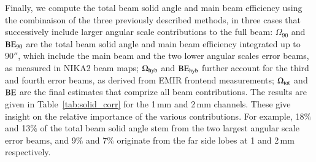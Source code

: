 {\rev Finally, we compute the total beam solid angle and main beam
efficiency using the combinaison of the three previously described
methods, in three cases that successively include larger angular scale
contributions to the full beam: $\Omega_{90}$ and $\rm{BE}_{90}$ are
the total beam solid angle and main beam efficiency integrated up to
$90''$, which include the main beam and the two lower angular scales
error beams, as measured in NIKA2 beam maps; $\Omega_{\rm{hyb}}$ and
$\rm{BE}_{\rm{hyb}}$ further account for the third and fourth error
beams, as derived from EMIR frontend measurements; $\Omega_{\rm{tot}}$
and $\rm{BE}$ are the final estimates that comprize all beam
contributions. The results are given in Table~\ref{tab:solid_corr} for
the 1\,mm and 2\,mm channels. These give insight on the relative
importance of the various contributions. For example, 18$\%$ and
13$\%$ of the total beam solid angle stem from the two largest angular
scale error beams, and 9$\%$ and 7$\%$ originate from the far side
lobes at 1 and 2\,mm respectively.}







